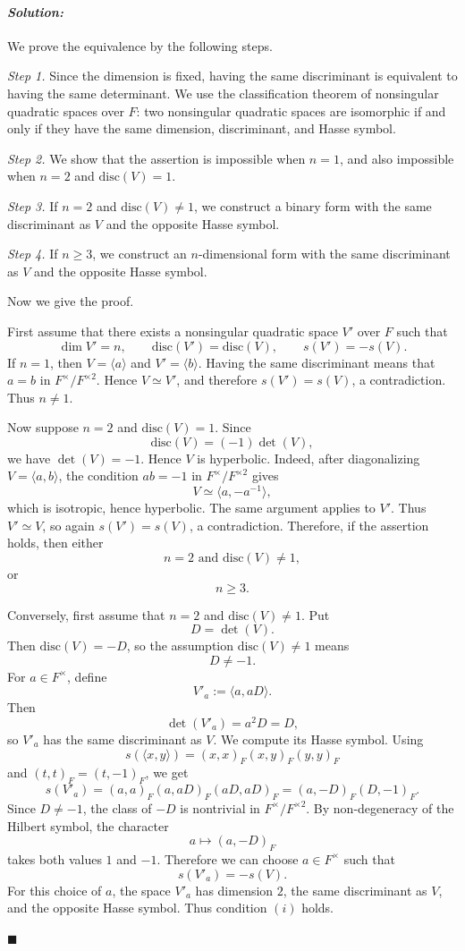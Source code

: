 \documentclass[12pt, a4paper]{article}
\newcommand{\disc}{\text{disc}}
\newenvironment{solution}
  {\paragraph{\textit{Solution:}}\par\medskip}
  {\hfill$\blacksquare$\vspace{0.1cm}}
\begin{document}
\begin{solution}
We prove the equivalence by the following steps.

\emph{Step 1.} Since the dimension is fixed, having the same discriminant is
equivalent to having the same determinant. We use the classification theorem
of nonsingular quadratic spaces over \(F\): two nonsingular quadratic spaces
are isomorphic if and only if they have the same dimension, discriminant, and
Hasse symbol.

\emph{Step 2.} We show that the assertion is impossible when \(n=1\), and also
impossible when \(n=2\) and \(\disc(V)=1\).

\emph{Step 3.} If \(n=2\) and \(\disc(V)\neq 1\), we construct a binary form
with the same discriminant as \(V\) and the opposite Hasse symbol.

\emph{Step 4.} If \(n\ge 3\), we construct an \(n\)-dimensional form with the
same discriminant as \(V\) and the opposite Hasse symbol.

Now we give the proof.

First assume that there exists a nonsingular quadratic space \(V'\) over \(F\)
such that
\[
\dim V'=n,\qquad \disc(V')=\disc(V),\qquad s(V')=-s(V).
\]
If \(n=1\), then \(V=\langle a\rangle\) and \(V'=\langle b\rangle\). Having the
same discriminant means that \(a=b\) in \(F^\times/F^{\times 2}\). Hence
\(V\simeq V'\), and therefore \(s(V')=s(V)\), a contradiction. Thus \(n\neq 1\).

Now suppose \(n=2\) and \(\disc(V)=1\). Since
\[
\disc(V)=(-1)\det(V),
\]
we have \(\det(V)=-1\). Hence \(V\) is hyperbolic. Indeed, after diagonalizing
\(V=\langle a,b\rangle\), the condition \(ab=-1\) in
\(F^\times/F^{\times 2}\) gives
\[
V\simeq \langle a,-a^{-1}\rangle,
\]
which is isotropic, hence hyperbolic. The same argument applies to \(V'\).
Thus \(V'\simeq V\), so again \(s(V')=s(V)\), a contradiction. Therefore, if
the assertion holds, then either
\[
n=2 \text{ and } \disc(V)\neq 1,
\]
or
\[
n\ge 3.
\]

Conversely, first assume that \(n=2\) and \(\disc(V)\neq 1\). Put
\[
D=\det(V).
\]
Then \(\disc(V)=-D\), so the assumption \(\disc(V)\neq 1\) means
\[
D\neq -1.
\]
For \(a\in F^\times\), define
\[
V'_a:=\langle a,aD\rangle.
\]
Then
\[
\det(V'_a)=a^2D=D,
\]
so \(V'_a\) has the same discriminant as \(V\). We compute its Hasse symbol.
Using
\[
s(\langle x,y\rangle)=(x,x)_F(x,y)_F(y,y)_F
\]
and \((t,t)_F=(t,-1)_F\), we get
\[
s(V'_a)
=(a,a)_F(a,aD)_F(aD,aD)_F
=(a,-D)_F(D,-1)_F.
\]
Since \(D\neq -1\), the class of \(-D\) is nontrivial in
\(F^\times/F^{\times 2}\). By non-degeneracy of the Hilbert symbol, the
character
\[
a\longmapsto (a,-D)_F
\]
takes both values \(1\) and \(-1\). Therefore we can choose \(a\in F^\times\)
such that
\[
s(V'_a)=-s(V).
\]
For this choice of \(a\), the space \(V'_a\) has dimension \(2\), the same
discriminant as \(V\), and the opposite Hasse symbol. Thus condition \((i)\)
holds.


\end{solution}
\end{document}
